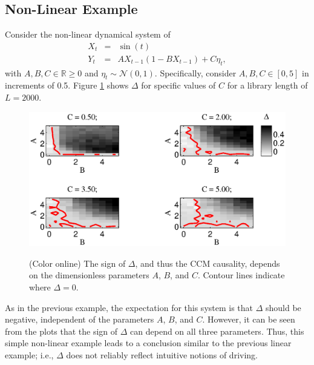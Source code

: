 \documentclass[twocolumn,aps,pre,groupedaddress]{revtex4-1}
\begin{document}
\subsection{Non-Linear Example}
Consider the non-linear dynamical system of
\begin{eqnarray}
\label{eqn:nonlinearEX}
X_t &=& \sin(t)\\
Y_t &=& AX_{t-1}\left(1-BX_{t-1}\right)+C\eta_t,
\end{eqnarray}
with $A,B,C\in\mathbb{R}\ge 0$ and $\eta_t\sim\mathcal{N}\left(0,1\right)$.  Specifically, consider $A,B,C\in[0,5]$ in increments of 0.5.  Figure \ref{fig:nonlinearex} shows $\Delta$ for specific values of $C$ for a library length of $L=2000$.
\begin{figure}[ht]
\includegraphics[scale=0.6]{NonLinearEx.eps} \\
\caption{(Color online) The sign of $\Delta$, and thus the CCM causality, depends on the dimensionless parameters $A$, $B$, and $C$. Contour lines indicate where $\Delta=0$.}
\label{fig:nonlinearex}
\end{figure}
As in the previous example, the expectation for this system is that $\Delta$ should be negative, independent of the parameters $A$, $B$, and $C$.  However, it can be seen from the plots that the sign of $\Delta$ can depend on all three parameters.  Thus, this simple non-linear example leads to a conclusion similar to the previous linear example; i.e., $\Delta$ does not reliably reflect intuitive notions of driving.
\end{document}
